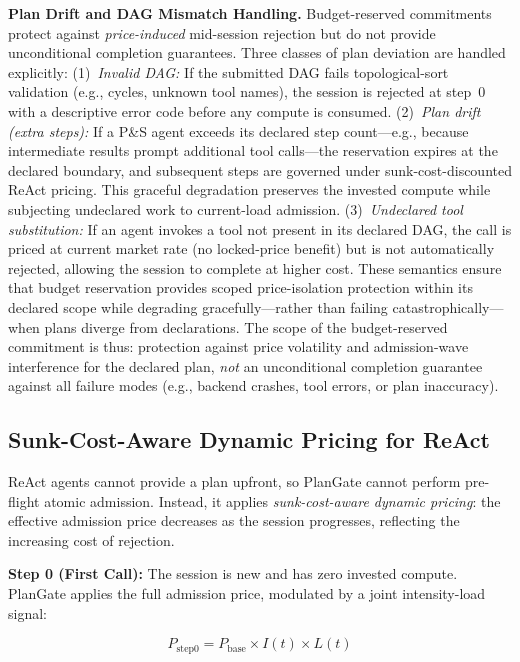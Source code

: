 \documentclass[sigconf,review,anonymous]{acmart}
\begin{document}
\textbf{Plan Drift and DAG Mismatch Handling.}
Budget-reserved commitments protect against \emph{price-induced} mid-session rejection but do not provide unconditional completion guarantees. Three classes of plan deviation are handled explicitly:
(1)~\emph{Invalid DAG:} If the submitted DAG fails topological-sort validation (e.g., cycles, unknown tool names), the session is rejected at step~0 with a descriptive error code before any compute is consumed.
(2)~\emph{Plan drift (extra steps):} If a P\&S agent exceeds its declared step count---e.g., because intermediate results prompt additional tool calls---the reservation expires at the declared boundary, and subsequent steps are governed under sunk-cost-discounted ReAct pricing. This graceful degradation preserves the invested compute while subjecting undeclared work to current-load admission.
(3)~\emph{Undeclared tool substitution:} If an agent invokes a tool not present in its declared DAG, the call is priced at current market rate (no locked-price benefit) but is not automatically rejected, allowing the session to complete at higher cost.
These semantics ensure that budget reservation provides scoped price-isolation protection within its declared scope while degrading gracefully---rather than failing catastrophically---when plans diverge from declarations. The scope of the budget-reserved commitment is thus: protection against price volatility and admission-wave interference for the declared plan, \emph{not} an unconditional completion guarantee against all failure modes (e.g., backend crashes, tool errors, or plan inaccuracy).

\subsection{Sunk-Cost-Aware Dynamic Pricing for ReAct}
\label{sec:sunkcost}

ReAct agents cannot provide a plan upfront, so PlanGate cannot perform pre-flight atomic admission. Instead, it applies \emph{sunk-cost-aware dynamic pricing}: the effective admission price decreases as the session progresses, reflecting the increasing cost of rejection.


\textbf{Step 0 (First Call):} The session is new and has zero invested compute. PlanGate applies the full admission price, modulated by a joint intensity-load signal:

\begin{equation}
\label{eq:step0}
P_{\text{step0}} = P_{\text{base}} \times I(t) \times L(t)
\end{equation}
\end{document}
